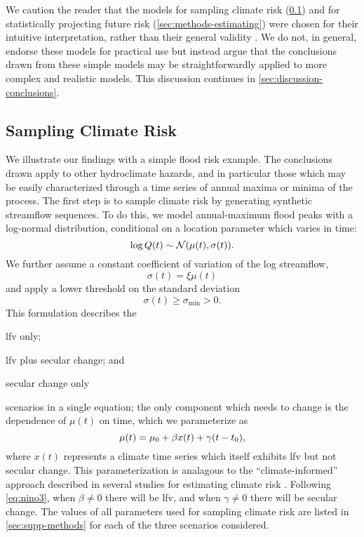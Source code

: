 \documentclass[
  draft,
  linenumbers
]{agujournal2018}
\newcommand{\normal}{\mathcal{N}}
\begin{document}
We caution the reader that the models for sampling climate risk (\cref{sec:methods-generating}) and for statistically projecting future risk (\cref{sec:methods-estimating}) were chosen for their intuitive interpretation, rather than their general validity \citep[see][for a thoughtful discussion of the value of simple models]{Held:2005cj}.
We do not, in general, endorse these models for practical use but instead argue that the conclusions drawn from these simple models may be straightforwardly applied to more complex and realistic models.
This discussion continues in \cref{sec:discussion-conclusions}.

\subsection{Sampling Climate Risk}\label{sec:methods-generating}

We illustrate our findings with a simple flood risk example.
The conclusions drawn apply to other hydroclimate hazards, and in particular those which may be easily characterized through a time series of annual maxima or minima of the process.
The first step is to sample climate risk by generating synthetic streamflow sequences.
To do this, we model  annual-maximum flood peaks with a log-normal distribution, conditional on a location parameter which varies in time:
\begin{equation} \label{eq:log-normal}
  \log Q(t) \sim \normal \qty(\mu(t), \sigma(t)).
\end{equation}
We further assume a constant coefficient of variation of the log streamflow,
\begin{equation}
  \sigma(t) = \xi \mu(t)  
\end{equation}
and apply a lower threshold on the standard deviation
\begin{equation}
  \sigma(t) \geq \sigma_\text{min} > 0.
\end{equation}
This formulation describes the \begin{enumerate*}[label= (\roman*)]
  \item \gls{lfv} only;
  \item \gls{lfv} plus secular change; and
  \item secular change only
\end{enumerate*}
scenarios in a single equation; the only component which needs to change is the dependence of $\mu(t)$ on time, which we parameterize as
\begin{equation}\label{eq:nino3}
  \mu(t) = \mu_0 + \beta x(t) + \gamma \qty(t - t_0),
\end{equation}
where $x(t)$ represents a climate time series which itself exhibits \gls{lfv} but not secular change.
This parameterization is analagous to the ``climate-informed'' approach described in several studies for estimating climate risk \citep{Delgado:2014ey,Merz:2014gf,Farnham:2018gs}.
Following \cref{eq:nino3}, when $\beta \neq 0$ there will be \gls{lfv}, and when $\gamma \neq 0$ there will be secular change.
The values of all parameters used for sampling climate risk are listed in \cref{sec:supp-methods} for each of the three scenarios considered.
\end{document}
